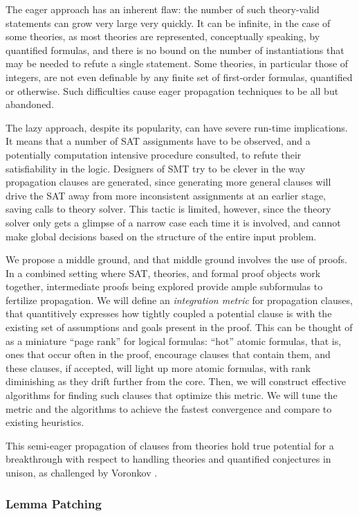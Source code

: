 The eager approach has an inherent flaw: the number of such theory-valid
statements can grow very large very quickly.
It can be infinite, in the case of some theories, as most theories are
represented, conceptually speaking, by quantified formulas, and there is no
bound on the number of instantiations that may be needed to refute a single
statement.
Some theories, in particular those of integers, are not even definable by any
finite set of first-order formulas, quantified or otherwise.
Such difficulties cause eager propagation techniques to be all but abandoned.

The lazy approach, despite its popularity, can have severe run-time
implications.
It means that a number of SAT assignments have to be observed, and a
potentially computation intensive procedure consulted, to refute their
satisfiability in the logic.
Designers of SMT try to be clever in the way propagation clauses are generated,
since generating more general clauses will drive the SAT away from more
inconsistent assignments at an earlier stage, saving calls to theory solver.
This tactic is limited, however, since the theory solver only gets a glimpse
of a narrow case each time it is involved, and cannot make global decisions
based on the structure of the entire input problem.

We propose a middle ground, and that middle ground involves the use of proofs.
In a combined setting where SAT, theories, and formal proof objects work
together, intermediate proofs being explored provide ample subformulas to
fertilize propagation.
We will define an \emph{integration metric} for propagation clauses, that
quantitively expresses how tightly coupled a potential clause is with the
existing set of assumptions and goals present in the proof.
This can be thought of as a miniature ``page rank'' for logical formulas:
``hot'' atomic formulas, that is, ones that occur often in the proof, encourage
clauses that contain them, and these clauses, if accepted, will light up
more atomic formulas, with rank diminishing as they drift further from the
core.
Then, we will construct effective algorithms for finding such clauses that
optimize this metric.
We will tune the metric and the algorithms to achieve the fastest convergence
and compare to existing heuristics.

This semi-eager propagation of clauses from theories hold true potential for
a breakthrough with respect to handling theories and quantified conjectures
in unison, as challenged by Voronkov \cite{}.


\subsubsection{Lemma Patching}


